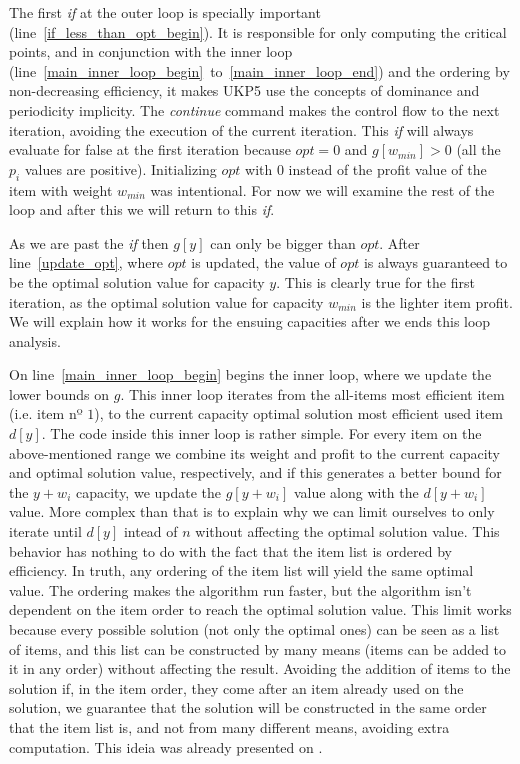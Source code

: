 \documentclass[12pt]{article}
\begin{document}
The first \textit{if} at the outer loop is specially important (line~\ref{if_less_than_opt_begin}). It is responsible for only computing the critical points, and in conjunction with the inner loop (line~\ref{main_inner_loop_begin}~to~\ref{main_inner_loop_end}) and the ordering by non-decreasing efficiency, it makes UKP5 use the concepts of dominance and periodicity implicity. The \textit{continue} command makes the control flow to the next iteration, avoiding the execution of the current iteration. This \textit{if} will always evaluate for false at the first iteration because \(opt = 0\) and \(g[w_{min}] > 0\) (all the \(p_i\) values are positive). Initializing \(opt\) with \(0\) instead of the profit value of the item with weight \(w_{min}\) was intentional. For now we will examine the rest of the loop and after this we will return to this \textit{if}.

As we are past the \textit{if} then \(g[y]\) can only be bigger than \(opt\). After line~\ref{update_opt}, where \(opt\) is updated, the value of \(opt\) is always guaranteed to be the optimal solution value for capacity \(y\). This is clearly true for the first iteration, as the optimal solution value for capacity \(w_{min}\) is the lighter item profit. We will explain how it works for the ensuing capacities after we ends this loop analysis. %

On line~\ref{main_inner_loop_begin} begins the inner loop, where we update the lower bounds on \(g\). This inner loop iterates from the all-items most efficient item (i.e. item nº \(1\)), to the current capacity optimal solution most efficient used item \(d[y]\). The code inside this inner loop is rather simple. For every item on the above-mentioned range we combine its weight and profit to the current capacity and optimal solution value, respectively, and if this generates a better bound for the \(y+w_i\) capacity, we update the \(g[y+w_i]\) value along with the \(d[y+w_i]\) value. More complex than that is to explain why we can limit ourselves to only iterate until \(d[y]\) intead of \(n\) without affecting the optimal solution value. This behavior has nothing to do with the fact that the item list is ordered by efficiency. In truth, any ordering of the item list will yield the same optimal value. The ordering makes the algorithm run faster, but the algorithm isn't dependent on the item order to reach the optimal solution value. This limit works because every possible solution (not only the optimal ones) can be seen as a list of items, and this list can be constructed by many means (items can be added to it in any order) without affecting the result. Avoiding the addition of items to the solution if, in the item order, they come after an item already used on the solution, we guarantee that the solution will be constructed in the same order that the item list is, and not from many different means, avoiding extra computation. This ideia was already presented on \cite{garfinkel}.
\end{document}
